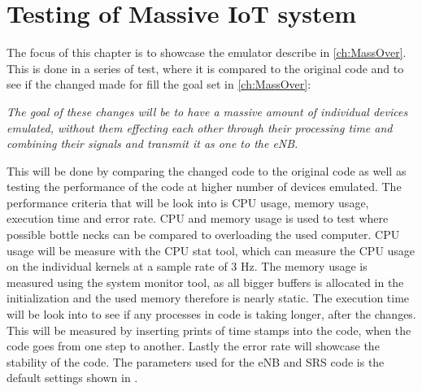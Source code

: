 \chapter{Testing of Massive IoT system}
The focus of this chapter is to showcase the emulator describe in \autoref{ch:MassOver}. This is done in a series of test, where it is compared to the original code and to see if the changed made for fill the goal set in \autoref{ch:MassOver}:

\textit{The goal of these changes will be to have a massive amount of individual devices emulated, without them effecting each other through their processing time and combining their signals and transmit it as one to the eNB.}

This will be done by comparing the changed code to the original code as well as testing the performance of the code at higher number of devices emulated.
The performance criteria that will be look into is CPU usage, memory usage, execution time and error rate.
CPU and memory usage is used to test where possible bottle necks can be compared to overloading the used computer. CPU usage will be measure with the CPU stat tool, which can measure the CPU usage on the individual kernels at a sample rate of 3 Hz. The memory usage is measured using the system monitor tool, as all bigger buffers is allocated in the initialization and the used memory therefore is nearly static. The execution time will be look into to see if any processes in code is taking longer, after the changes. This will be measured by inserting prints of time stamps into the code, when the code goes from one step to another. Lastly the error rate will showcase the stability of the code.
The parameters used for the eNB and SRS code is the default settings shown in .